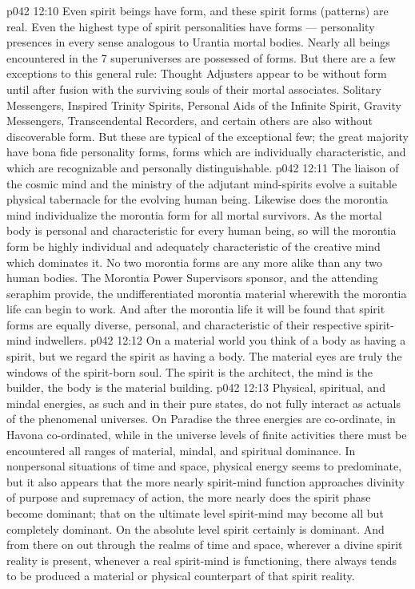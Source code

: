 \vs p042 12:10 Even spirit beings have form, and these spirit forms (patterns) are real. Even the highest type of spirit personalities have forms --- personality presences in every sense analogous to Urantia mortal bodies. Nearly all beings encountered in the 7 superuniverses are possessed of forms. But there are a few exceptions to this general rule: Thought Adjusters appear to be without form until after fusion with the surviving souls of their mortal associates. Solitary Messengers, Inspired Trinity Spirits, Personal Aids of the Infinite Spirit, Gravity Messengers, Transcendental Recorders, and certain others are also without discoverable form. But these are typical of the exceptional few; the great majority have bona fide personality forms, forms which are individually characteristic, and which are recognizable and personally distinguishable.
\vs p042 12:11 The liaison of the cosmic mind and the ministry of the adjutant mind\hyp{}spirits evolve a suitable physical tabernacle for the evolving human being. Likewise does the morontia mind individualize the morontia form for all mortal survivors. As the mortal body is personal and characteristic for every human being, so will the morontia form be highly individual and adequately characteristic of the creative mind which dominates it. No two morontia forms are any more alike than any two human bodies. The Morontia Power Supervisors sponsor, and the attending seraphim provide, the undifferentiated morontia material wherewith the morontia life can begin to work. And after the morontia life it will be found that spirit forms are equally diverse, personal, and characteristic of their respective spirit\hyp{}mind indwellers.
\vs p042 12:12 \pc On a material world you think of a body as having a spirit, but we regard the spirit as having a body. The material eyes are truly the windows of the spirit\hyp{}born soul. The spirit is the architect, the mind is the builder, the body is the material building.
\vs p042 12:13 \pc Physical, spiritual, and mindal energies, as such and in their pure states, do not fully interact as actuals of the phenomenal universes. On Paradise the three energies are co\hyp{}ordinate, in Havona co\hyp{}ordinated, while in the universe levels of finite activities there must be encountered all ranges of material, mindal, and spiritual dominance. In nonpersonal situations of time and space, physical energy seems to predominate, but it also appears that the more nearly spirit\hyp{}mind function approaches divinity of purpose and supremacy of action, the more nearly does the spirit phase become dominant; that on the ultimate level spirit\hyp{}mind may become all but completely dominant. On the absolute level spirit certainly is dominant. And from there on out through the realms of time and space, wherever a divine spirit reality is present, whenever a real spirit\hyp{}mind is functioning, there always tends to be produced a material or physical counterpart of that spirit reality.
